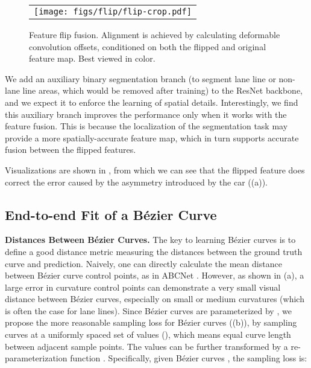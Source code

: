 \documentclass[10pt,twocolumn,letterpaper]{article}
\begin{document}
\begin{figure}[t]

\centering
    \begin{tabular}{c}
    \texttt{[image: figs/flip/flip-crop.pdf]}\\
    \end{tabular}
    \caption{Feature flip fusion. Alignment is achieved by calculating deformable convolution offsets, conditioned on both the flipped and original feature map. Best viewed in color.}
\vspace{-4mm}
\label{fig:flip}
\end{figure}

We add an auxiliary binary segmentation branch (to segment lane line or non-lane line areas, which would be removed after training) to the ResNet backbone, and we expect it to enforce the learning of spatial details.
Interestingly, we find this auxiliary branch improves the performance only when it works with the feature fusion. This is because the localization of the segmentation task may provide a more spatially-accurate feature map, which in turn supports accurate fusion between the flipped features.

Visualizations are shown in , from which we can see that the flipped feature does correct the error caused by the asymmetry introduced by the car ((a)).


\subsection{End-to-end Fit of a Bézier Curve}
\label{sec:bezierloss}

\noindent \textbf{Distances Between Bézier Curves.} The key to learning Bézier curves is to define a good distance metric measuring the distances between the ground truth curve and prediction.
Naively, one can directly calculate the mean  distance between Bézier curve control points, as in ABCNet \cite{liu2020abcnet}. However, as shown in (a), a large  error in curvature control points can demonstrate a very small visual distance between Bézier curves, especially on small or medium curvatures (which is often the case for lane lines). Since Bézier curves are parameterized by , we propose the more reasonable sampling loss for Bézier curves ((b)), by sampling curves at a uniformly spaced set of  values (), which means equal curve length between adjacent sample points. The  values can be further transformed by a re-parameterization function . Specifically, given Bézier curves , the sampling loss  is:
\end{document}
